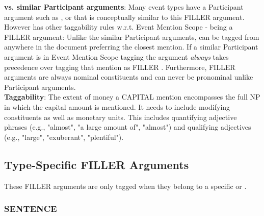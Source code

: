 \noindent\textbf{ vs. similar Participant arguments}:
Many event types have a Participant argument such as ,  or  that is conceptually similar to this FILLER argument.
However  has other taggability rules w.r.t. Event Mention Scope - being a FILLER argument: 
Unlike the similar Participant arguments,  can be tagged from anywhere in the document preferring the closest mention.
If a similar Participant argument is in Event Mention Scope tagging the argument \emph{always} takes precedence over tagging that mention as FILLER .
Furthermore, FILLER arguments are always nominal constituents and can never be pronominal unlike Participant arguments. \\

\noindent\textbf{Taggability}:
The extent of money a CAPITAL mention encompasses the full NP in which the capital amount is mentioned.
It needs to include modifying constituents as well as monetary units.
This includes quantifying adjective phrases (e.g., "almost", "a large amount of", "almost") and qualifying adjectives (e.g., "large", "exuberant", "plentiful").

\begin{exe}
    \ex {}
    \ex {}
    \ex {}
    \ex {}
\end{exe}


\vspace{0.5cm}


\subsection{Type-Specific FILLER Arguments}
These FILLER arguments are only tagged when they belong to a specific  or .

\hypertarget{SENTENCE}{
\subsubsection{SENTENCE}}

